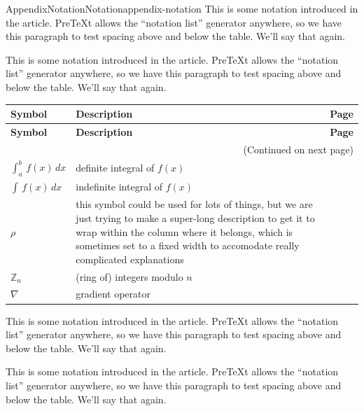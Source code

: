 \documentclass[twoside,10pt,]{article}
\numberwithin{equation}{section}
\begin{document}
\begin{appendixptx}{Appendix}{Notation}{}{Notation}{}{}{appendix-notation}
\renewcommand*{\appendixname}{Appendix}
This is some notation introduced in the article.  PreTeXt allows the ``notation list'' generator anywhere, so we have this paragraph to test spacing above and below the table.  We'll say that again.%
\par
This is some notation introduced in the article.  PreTeXt allows the ``notation list'' generator anywhere, so we have this paragraph to test spacing above and below the table.  We'll say that again.%
\begin{longtable}[l]{lp{}r}
\addtocounter{table}{-1}
\textbf{Symbol}&\textbf{Description}&\textbf{Page}\\[1em]
\endfirsthead
\textbf{Symbol}&\textbf{Description}&\textbf{Page}\\[1em]
\endhead
\multicolumn{3}{r}{(Continued on next page)}\\
\endfoot
\endlastfoot
\(\int_a^b\,f(x)\,dx\)&definite integral of \(f(x)\)&\pageref{section-introduction-2-5}\\
\(\int\,f(x)\,dx\)&indefinite integral of \(f(x)\)&\pageref{definition-indefinite-integral-3}\\
\(\rho\)&this symbol could be used for lots of things, but we are just trying to make a super-long description to get it to wrap within the column where it belongs, which is sometimes set to a fixed width to accomodate really complicated explanations&\pageref{derivatives-9-2-3}\\
\(\mathbb{Z}_n\)&(ring of) integers modulo \(n\)&\pageref{derivatives-9-2-11}\\
\(\nabla\)&gradient operator&\pageref{section-mathematics-3-3-3}\\
\end{longtable}
This is some notation introduced in the article.  PreTeXt allows the ``notation list'' generator anywhere, so we have this paragraph to test spacing above and below the table.  We'll say that again.%
\par
This is some notation introduced in the article.  PreTeXt allows the ``notation list'' generator anywhere, so we have this paragraph to test spacing above and below the table.  We'll say that again.%
\end{appendixptx}
%
%
\typeout{************************************************}
\typeout{************************************************}
%
\end{document}

